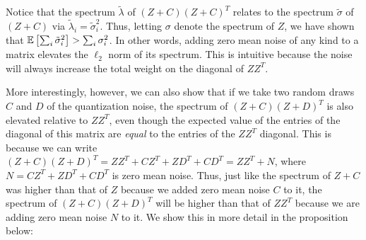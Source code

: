 \documentclass[12pt]{article}
\newcommand{\tsigma}{\tilde{\sigma}}
\newcommand{\tlambda}{\tilde{\lambda}}
\begin{document}
Notice that the spectrum $\tlambda$ of $(Z+C)(Z+C)^T$ relates to the spectrum $\tsigma$ of $(Z+C)$ via $\tlambda_i = \tsigma_i^2$.  Thus, letting $\sigma$ denote the spectrum of $Z$, we have shown that
$\expect{}{\sum_i \tsigma_i^2} > \sum_i \sigma_i^2$.  In other words, adding zero mean noise of any kind to a matrix elevates the $\ell_2$ norm of its spectrum.  This is intuitive because the noise will always increase the total weight on the diagonal of $ZZ^T$.

More interestingly, however, we can also show that if we take two random draws $C$ and $D$ of the quantization noise, the spectrum of $(Z+C)(Z+D)^T$ is also elevated relative to $ZZ^T$, even though the expected value of the entries of the diagonal of this matrix are \textit{equal} to the entries of the $ZZ^T$ diagonal.  This is because we can write $(Z+C)(Z+D)^T = ZZ^T + CZ^T + ZD^T + CD^T = ZZ^T + N$, where $N = CZ^T + ZD^T + CD^T$ is zero mean noise.  Thus, just like the spectrum of $Z+C$ was higher than that of $Z$ because we added zero mean noise $C$ to it, the spectrum of $(Z+C)(Z+D)^T$ will be higher than that of $ZZ^T$ because we are adding zero mean noise $N$ to it.  We show this in more detail in the proposition below:
\end{document}
